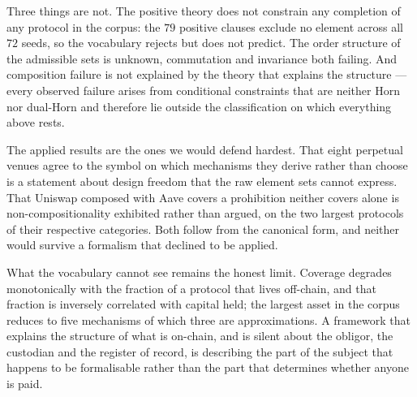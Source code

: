 \documentclass[11pt]{article}
\theoremstyle{definition}
\theoremstyle{plain}
\theoremstyle{remark}
\begin{document}
Three things are not. The positive theory does not constrain any completion of
any protocol in the corpus: the $79$ positive clauses exclude no element across
all $72$ seeds, so the vocabulary rejects but does not predict. The order
structure of the admissible sets is unknown, commutation and invariance both
failing. And composition failure is not explained by the theory that explains the
structure --- every observed failure arises from conditional constraints that are
neither Horn nor dual-Horn and therefore lie outside the classification on which
everything above rests.

The applied results are the ones we would defend hardest. That eight perpetual
venues agree to the symbol on which mechanisms they derive rather than choose is
a statement about design freedom that the raw element sets cannot express. That
Uniswap composed with Aave covers a prohibition neither covers alone is
non-compositionality exhibited rather than argued, on the two largest protocols
of their respective categories. Both follow from the canonical form, and neither
would survive a formalism that declined to be applied.

What the vocabulary cannot see remains the honest limit. Coverage degrades
monotonically with the fraction of a protocol that lives off-chain, and that
fraction is inversely correlated with capital held; the largest asset in the
corpus reduces to five mechanisms of which three are approximations. A framework
that explains the structure of what is on-chain, and is silent about the obligor,
the custodian and the register of record, is describing the part of the subject
that happens to be formalisable rather than the part that determines whether
anyone is paid.



\end{document}
